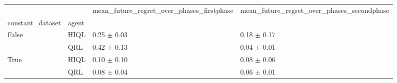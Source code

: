 \begin{tabular}{llll}
\toprule
 &  & mean_future_regret_over_phases_firstphase & mean_future_regret_over_phases_secondphase \\
constant_dataset & agent &  &  \\
\midrule
\multirow[t]{2}{*}{False} & HIQL & 0.25 $\pm$ 0.03 & 0.18 $\pm$ 0.17 \\
 & QRL & 0.42 $\pm$ 0.13 & 0.04 $\pm$ 0.01 \\
\cline{1-4}
\multirow[t]{2}{*}{True} & HIQL & 0.10 $\pm$ 0.10 & 0.08 $\pm$ 0.06 \\
 & QRL & 0.08 $\pm$ 0.04 & 0.06 $\pm$ 0.01 \\
\cline{1-4}
\bottomrule
\end{tabular}
